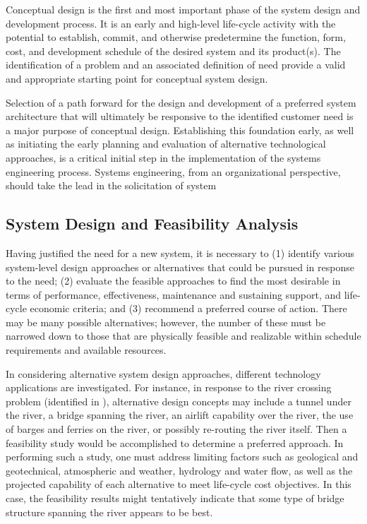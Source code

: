 Conceptual design is the first and most important phase of the system design and development process. It is an early and high-level life-cycle activity with the potential to establish, commit, and otherwise predetermine the function, form, cost, and development schedule of the desired system and its product(s). The identification of a problem and an associated definition of need provide a valid and appropriate starting point for conceptual system design.	

Selection of a path forward for the design and development of a preferred system architecture that will ultimately be responsive to the identified customer need is a major purpose of conceptual design. Establishing this foundation early, as well as initiating the early planning and evaluation of alternative technological approaches, is a critical initial step in the implementation of the systems engineering process. Systems engineering, from an organizational perspective, should take the lead in the solicitation of system 

\subsection{System Design and Feasibility Analysis}

Having justified the need for a new system, it is necessary to (1) identify various system-level design approaches or alternatives that could be pursued in response to the need; (2) evaluate the feasible approaches to find the most desirable in terms of performance, effectiveness, maintenance and sustaining support, and life-cycle economic criteria; and (3) recommend a preferred course of action. There may be many possible alternatives; however, the number of these must be narrowed down to those that are physically feasible and realizable within schedule requirements and available resources.

In considering alternative system design approaches, different technology applications are investigated. For instance, in response to the river crossing problem (identified in ), alternative design concepts may include a tunnel under the river, a bridge spanning the river, an airlift capability over the river, the use of barges and ferries on the river, or possibly re-routing the river itself. Then a feasibility study would be accomplished to determine a preferred approach. In performing such a study, one must address limiting factors such as geological and geotechnical, atmospheric and weather, hydrology and water flow, as well as the projected capability of each alternative to meet life-cycle cost objectives. In this case, the feasibility results might tentatively indicate that some type of bridge structure spanning the river appears to be best.

